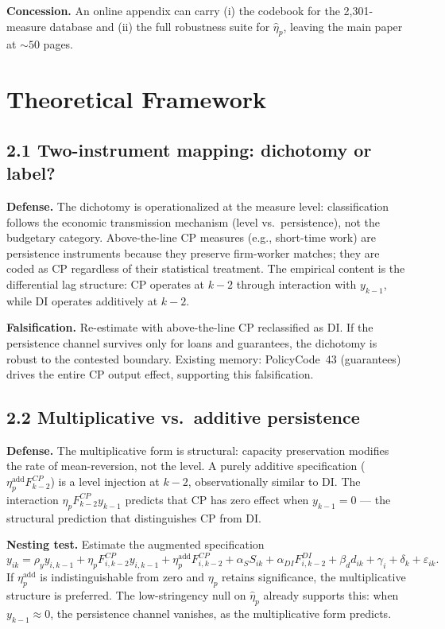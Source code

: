 \documentclass[11pt,a4paper]{article}
\begin{document}
\textbf{Concession.} An online appendix can carry (i) the codebook for the 2{,}301-measure database and (ii) the full robustness suite for $\hat\eta_p$, leaving the main paper at $\sim 50$ pages.

\section{Theoretical Framework}

\subsection*{2.1 Two-instrument mapping: dichotomy or label?}

\textbf{Defense.} The dichotomy is operationalized at the measure level: classification follows the economic transmission mechanism (level vs.\ persistence), not the budgetary category. Above-the-line CP measures (e.g., short-time work) are persistence instruments because they preserve firm-worker matches; they are coded as CP regardless of their statistical treatment. The empirical content is the differential lag structure: CP operates at $k-2$ through interaction with $y_{k-1}$, while DI operates additively at $k-2$.

\textbf{Falsification.} Re-estimate with above-the-line CP reclassified as DI. If the persistence channel survives only for loans and guarantees, the dichotomy is robust to the contested boundary. Existing memory: PolicyCode~43 (guarantees) drives the entire CP output effect, supporting this falsification.

\subsection*{2.2 Multiplicative vs.\ additive persistence}

\textbf{Defense.} The multiplicative form is structural: capacity preservation modifies the rate of mean-reversion, not the level. A purely additive specification ($\eta_p^{\text{add}} F^{CP}_{k-2}$) is a level injection at $k-2$, observationally similar to DI. The interaction $\eta_p F^{CP}_{k-2} y_{k-1}$ predicts that CP has zero effect when $y_{k-1} = 0$ --- the structural prediction that distinguishes CP from DI.

\textbf{Nesting test.} Estimate the augmented specification
\[
y_{ik} = \rho_y y_{i,k-1} + \eta_p F^{CP}_{i,k-2} y_{i,k-1} + \eta_p^{\text{add}} F^{CP}_{i,k-2} + \alpha_S S_{ik} + \alpha_{DI} F^{DI}_{i,k-2} + \beta_d d_{ik} + \gamma_i + \delta_k + \varepsilon_{ik}.
\]
If $\eta_p^{\text{add}}$ is indistinguishable from zero and $\eta_p$ retains significance, the multiplicative structure is preferred. The low-stringency null on $\hat\eta_p$ already supports this: when $y_{k-1} \approx 0$, the persistence channel vanishes, as the multiplicative form predicts.
\end{document}

